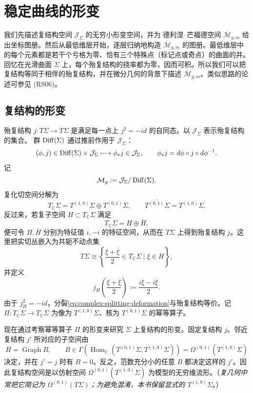 \section{稳定曲线的形变}
\label{sec:deformations-stable-curves}
\setcounter{equation}{14}

我们先描述复结构空间 $\mathcal J_\Sigma$ 的无穷小形变空间，并为
德利涅--芒福德空间 $\overline{\mathcal M}_{g,m}$ 给出坐标图册。然后从最低维层开始，逐层归纳地构造
$\overline{\mathcal M}_{g,m}$ 的图册。最低维层中的每个元素都是若干个亏格为零、恰有三个特殊点（标记点或奇点）的曲面的并。
回忆在光滑曲面 $\Sigma$ 上，每个殆复结构的挠率都为零，因而可积。所以我们可以把复结构等同于相伴的殆复结构，并在微分几何的背景下描述
$\overline{\mathcal M}_{g,m}$。类似思路的论述可参见 (RS06)。

\subsection{复结构的形变}
\label{subsec:deformations-complex-structures}

殆复结构 $j:T\Sigma\to T\Sigma$ 是满足每一点上 $j^2=-id$ 的自同态。以 $\mathcal J_\Sigma$ 表示殆复结构的集合。
群 $\operatorname{Diff}(\Sigma)$ 通过推前作用于 $\mathcal J_\Sigma$：
\[
 (\phi,j)\in\operatorname{Diff}(\Sigma)\times\mathcal J_\Sigma
 \longmapsto \phi_*j\in\mathcal J_\Sigma,
 \qquad \phi_*j=d\phi\circ j\circ d\phi^{-1}.
\]
记
\[
 \mathcal M_g:=\mathcal J_\Sigma/\operatorname{Diff}(\Sigma).
\]
复化切空间分解为
\[
 T_{\mathbb C}\Sigma=T^{(1,0)}\Sigma\oplus T^{(0,1)}\Sigma,
 \qquad \overline{T^{(0,1)}\Sigma}=T^{(1,0)}\Sigma.
\]
反过来，若复子空间 $H\subset T_{\mathbb C}\Sigma$ 满足
\begin{equation}
 T_{\mathbb C}\Sigma=H\oplus\overline H,
 \label{eq:complex-splitting-deformation}
\end{equation}
便可令 $H,\overline H$ 分别为特征值 $i,-i$ 的特征空间，从而在 $T\Sigma$ 上得到殆复结构 $j$。这里把实切丛嵌入为共轭不动点集
\[
 T\Sigma\cong\left\{\frac{\xi+\overline\xi}{2}\in T_{\mathbb C}\Sigma\mid \xi\in H\right\},
\]
并定义
\[
 j_H\left(\frac{\xi+\overline\xi}{2}\right):=
 \frac{i\xi-i\overline\xi}{2}.
\]
由于 $j_H^2=-id$，分裂\eqref{eq:complex-splitting-deformation}与殆复结构等价。记 $\Pi:T_{\mathbb C}\Sigma\to T_{\mathbb C}\Sigma$ 为像为 $T^{(1,0)}\Sigma$、核为 $T^{(0,1)}\Sigma$ 的幂等算子。

现在通过考察幂等算子 $\Pi$ 的形变来研究 $\Sigma$ 上复结构的形变。固定复结构 $j$。邻近复结构 $j'$ 所对应的子空间由
\[
 \overline H=\operatorname{Graph}B,
 \qquad B\in\Gamma\!\left(\operatorname{Hom}_{\mathbb C}
 (T^{(0,1)}\Sigma,T^{(1,0)}\Sigma)\right)
 =\Omega^{(0,1)}(T^{(1,0)}\Sigma)
\]
决定，并在 $j'=j$ 时有 $B=0$。反之，范数充分小的任意 $B$ 都决定这样的 $j'$。因此复结构空间是以仿射空间
$\Omega^{(0,1)}(T^{(1,0)}\Sigma)$ 为模型的无穷维流形。（\emph{复几何中常把它简记为 $\Omega^{(0,1)}(T\Sigma)$；为避免混淆，本书保留显式的 $T^{(1,0)}\Sigma$}。）

